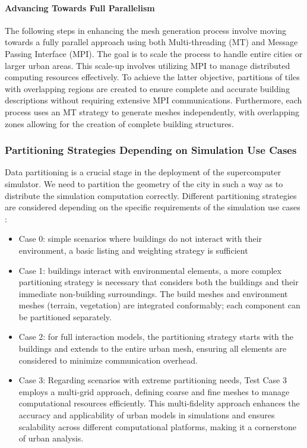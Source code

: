 \documentclass[runningheads]{llncs}
\begin{document}
\paragraph{Advancing Towards Full Parallelism}
The following steps in enhancing the mesh generation process involve moving towards a fully parallel approach using both Multi-threading (MT) and Message Passing Interface (MPI). The goal is to scale the process to handle entire cities or larger urban areas. This scale-up involves utilizing MPI to manage distributed computing resources effectively. To achieve the latter objective, partitions of tiles with overlapping regions are created to ensure complete and accurate building descriptions without requiring extensive MPI communications. Furthermore, each process uses an MT strategy to generate meshes independently, with overlapping zones allowing for the creation of complete building structures.

\subsubsection{Partitioning Strategies Depending on Simulation Use Cases}

Data partitioning is a crucial stage in the deployment of the supercomputer simulator. We need to partition the geometry of the city in such a way as to distribute the simulation computation correctly.
Different partitioning strategies are considered depending on the specific requirements of the simulation use cases :
\begin{itemize}
\item Case 0: simple scenarios where buildings do not interact with their environment, a basic listing and weighting strategy is sufficient
\item Case 1: buildings interact with environmental elements, a more complex partitioning strategy is necessary that considers both the buildings and their immediate non-building surroundings. The build meshes and environment meshes (terrain, vegetation) are integrated conformably; each component can be partitioned separately.
\item Case 2: for full interaction models, the partitioning strategy starts with the buildings and extends to the entire urban mesh, ensuring all elements are considered to minimize communication overhead.
\item Case 3: Regarding scenarios with extreme partitioning needs, Test Case 3 employs a multi-grid approach, defining coarse and fine meshes to manage computational resources efficiently. This multi-fidelity approach enhances the accuracy and applicability of urban models in simulations and ensures scalability across different computational platforms, making it a cornerstone of urban analysis.
\end{itemize}
\end{document}
